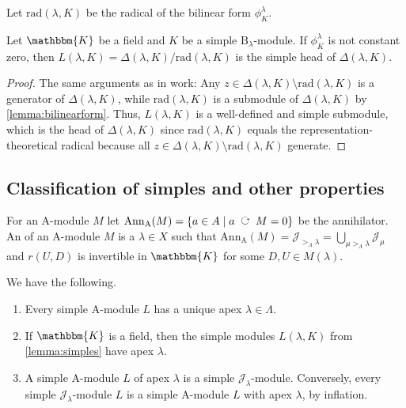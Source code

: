 \documentclass[a4paper,11pt]{amsart}
\let\emph\relax
\newcommand{\actsleft}{\mathop{\,\;\raisebox{1.7ex}{\rotatebox{-90}{$\circlearrowright$}}\;\,}}
\newcommand{\setstuff}[1]{\mathrm{#1}}
\newcommand{\KK}{\mathbbm{K}}
\numberwithin{equation}{section}
\let\fullref\autoref
\begin{document}
Let $\mathrm{rad}(\lambda,K)$ be the radical of the 
bilinear form $\phi^{\lambda}_{K}$.

\begin{lemma}\label{lemma:simples}
Let $\KK$ be a field and $K$ be a simple 
$\setstuff{B}_{\lambda}$-module.
If $\phi^{\lambda}_{K}$ is not constant zero, then
$L(\lambda,K)=\Delta(\lambda,K)/\mathrm{rad}(\lambda,K)$ is 
the simple head of $\Delta(\lambda,K)$.
\end{lemma}

\begin{proof}
The same arguments as in \cite[Section 3A]{EhTu-relcell} work: 
Any $z\in\Delta(\lambda,K)\setminus\mathrm{rad}(\lambda,K)$ is a generator 
of $\Delta(\lambda,K)$, while $\mathrm{rad}(\lambda,K)$ is a submodule 
of $\Delta(\lambda,K)$ by \fullref{lemma:bilinearform}. 
Thus, $L(\lambda,K)$ is a well-defined and 
simple submodule, which is the head of $\Delta(\lambda,K)$ since $\mathrm{rad}(\lambda,K)$ equals 
the representation-theoretical radical because all 
$z\in\Delta(\lambda,K)\setminus\mathrm{rad}(\lambda,K)$ generate.
\end{proof}

\subsection{Classification of simples and other properties}\label{subsection:simples}

For an $\setstuff{A}$-module $M$ let 
$\mathrm{Ann}_{\setstuff{A}}(M)=
\{a\in A\mid a\actsleft M=0\}$ be the annihilator.
An \emph{apex} of an $\setstuff{A}$-module $M$ 
is a $\lambda\in X$ such that 
$\mathrm{Ann}_{\setstuff{A}}(M)=
\mathcal{J}_{{>_{\Lambda}}\lambda}=
\bigcup_{\mu>_{\Lambda}\lambda}\mathcal{J}_{\mu}$ 
and $r(U,D)$ is invertible in $\KK$ for some $D,U\in M(\lambda)$.

\begin{lemma}\label{lemma:apex}
We have the following.

\begin{enumerate}

\item Every simple $\setstuff{A}$-module $L$ has a unique apex 
$\lambda\in\Lambda$.

\item If $\KK$ is a field, then the simple modules $L(\lambda,K)$ 
from \fullref{lemma:simples}
have apex $\lambda$.

\item A simple $\setstuff{A}$-module $L$ of apex $\lambda$ is a 
simple $\mathcal{J}_{\lambda}$-module. Conversely, 
every simple $\mathcal{J}_{\lambda}$-module $L$ is a simple 
$\setstuff{A}$-module $L$ with apex $\lambda$, by inflation.

\end{enumerate}
\end{lemma}
\end{document}
